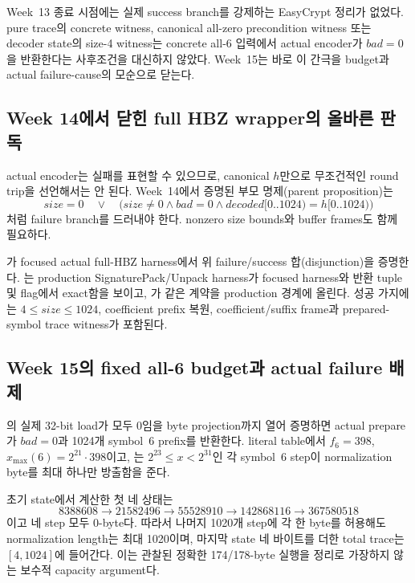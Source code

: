 Week~13 종료 시점에는 실제 success branch를 강제하는 EasyCrypt 정리가 없었다.
pure trace의 concrete witness, canonical all-zero precondition witness 또는
decoder state의 size-4 witness는 concrete all-6 입력에서 actual encoder가
\(bad=0\)을 반환한다는 사후조건을 대신하지 않았다. Week~15는 바로 이 간극을
budget과 actual failure-cause의 모순으로 닫는다.

\subsection{Week 14에서 닫힌 full HBZ wrapper의 올바른 판독}

actual encoder는 실패를 표현할 수 있으므로, canonical \(h\)만으로 무조건적인
round trip을 선언해서는 안 된다. Week~14에서 증명된 부모 명제(parent proposition)는
\[
  size=0\quad\lor\quad
  \bigl(size\ne0\land bad=0\land
        decoded[0..1024)=h[0..1024)\bigr)
\]
처럼 failure branch를 드러내야 한다. nonzero size bounds와 buffer frames도
함께 필요하다.

\begin{verified}
가 focused actual
full-HBZ harness에서 위 failure/success 합(disjunction)을 증명한다.
는 production
SignaturePack/Unpack harness가 focused harness와 반환 tuple 및
 flag에서 exact함을 보이고,
가 같은 계약을
production 경계에 올린다. 성공 가지에는 \(4\le size\le1024\), coefficient
prefix 복원, coefficient/suffix frame과 prepared-symbol trace witness가 포함된다.
\end{verified}

\subsection{Week 15의 fixed all-6 budget과 actual failure 배제}

의 실제 32-bit load가 모두 0임을 byte projection까지 열어
증명하면 actual prepare가 \(bad=0\)과 1024개 symbol~6 prefix를 반환한다. literal
table에서 \(f_6=398\), \(x_{\max}(6)=2^{21}\cdot398\)이고,
는 \(2^{23}\le x<2^{31}\)인 각
symbol~6 step이 normalization byte를 최대 하나만 방출함을 준다.

초기 state에서 계산한 첫 네 상태는
\[
  8388608\to21582496\to55528910\to142868116\to367580518
\]
이고 네 step 모두 0-byte다. 따라서 나머지 1020개 step에 각 한 byte를 허용해도
normalization length는 최대 1020이며, 마지막 state 네 바이트를 더한 total
trace는 \([4,1024]\)에 들어간다. 이는 관찰된 정확한 174/178-byte 실행을
정리로 가장하지 않는 보수적 capacity argument다.


